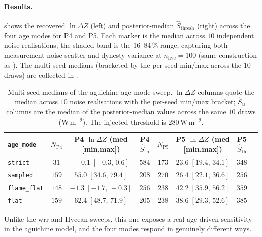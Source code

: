 \paragraph{Results.}
 shows the recovered $\ln\Delta Z$
(left) and posterior-median $\hat{S}_\mathrm{thresh}$ (right) across
the four age modes for P4 and P5.  Each marker is the median across
$10$ independent noise realisations; the shaded band is the
$16$--$84\,\%$ range, capturing both measurement-noise scatter and
dynesty variance at $n_\mathrm{live}=100$ (same construction as
).  The multi-seed medians (bracketed by the
per-seed min/max across the 10 draws) are collected in
.

\begin{table}[H]
    \centering
    \caption[Multi-seed medians of the aguichine age sweep]{%
        Multi-seed medians of the aguichine age-mode sweep.  $\ln\Delta Z$
        columns quote the median across $10$ noise realisations with the
        per-seed min/max bracket; $\hat{S}_\mathrm{th}$ columns are the
        median of the posterior-median values across the same $10$ draws
        (W\,m$^{-2}$).  The injected threshold is $280\,\mathrm{W\,m^{-2}}$.}
    \label{tab:aguichine_age_results}
    \small
    \begin{tabular}{lccccccc}
        \toprule
        \texttt{age\_mode} & $N_\mathrm{P4}$ & P4 $\ln\Delta Z$ (med [min,max])
        & P4 $\hat{S}_\mathrm{th}$
        & $N_\mathrm{P5}$ & P5 $\ln\Delta Z$ (med [min,max])
        & P5 $\hat{S}_\mathrm{th}$ \\
        \midrule
        \texttt{strict}     & $31$  & $\phantom{-}0.1\;[-0.3,\,0.6]$   & $584$ & $173$ & $23.6\;[19.4,\,34.1]$  & $348$ \\
        \texttt{sampled}    & $159$ & $55.0\;[34.6,\,79.4]$            & $208$ & $270$ & $26.4\;[22.1,\,36.6]$  & $256$ \\
        \texttt{flame\_flat}& $148$ & $-1.3\;[-1.7,\,-0.3]$            & $256$ & $238$ & $42.2\;[35.9,\,56.2]$  & $359$ \\
        \texttt{flat}       & $159$ & $62.4\;[48.7,\,71.9]$            & $205$ & $238$ & $38.6\;[29.3,\,52.6]$  & $385$ \\
        \bottomrule
    \end{tabular}
\end{table}

Unlike the wrr and Hycean sweeps, this one exposes a real
age-driven sensitivity in the aguichine model, and the four modes
respond in genuinely different ways.

